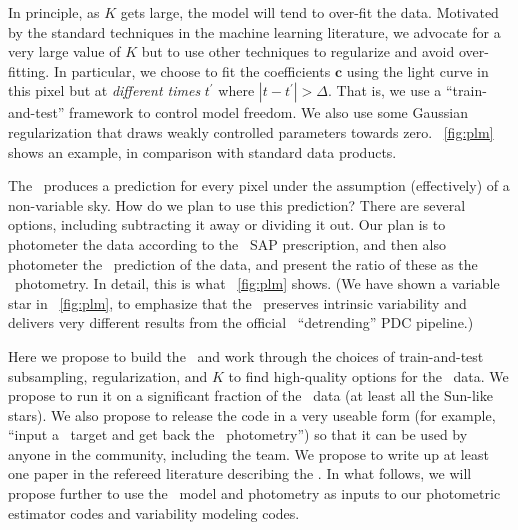 \documentclass[letterpaper,12pt,preprint]{hack_aastex}
\newcommand{\bvec}[1]{{\ensuremath{{\boldsymbol{#1}}}}}
\begin{document}
In principle, as $K$ gets large, the model will tend to over-fit the data.
Motivated by the standard techniques in the machine learning literature, we
advocate for a very large value of $K$ but to use other techniques to regularize
and avoid over-fitting.
In particular, we choose to fit the coefficients $\bvec{c}$ using the light
curve in this pixel but at \emph{different times} $t^\prime$ where
$|t-t^\prime| > \Delta$.
That is, we use a ``train-and-test'' framework to control model freedom.
We also use some Gaussian regularization that draws weakly controlled parameters
towards zero.
\figurename~\ref{fig:plm} shows an example, in comparison with standard \Kepler
data products.


The \PLM\ produces a prediction for every pixel under the assumption
(effectively) of a non-variable sky.
How do we plan to use this prediction?
There are several options, including subtracting it away or dividing it out.
Our plan is to photometer the data according to the \Kepler\ SAP prescription,
and then also photometer the \PLM\ prediction of the data, and present the
ratio of these as the \PLM\ photometry.
In detail, this is what \figurename~\ref{fig:plm} shows.
(We have shown a variable star in \figurename~\ref{fig:plm}, to emphasize that
the \PLM\ preserves intrinsic variability and delivers very different results
from the official \Kepler\ ``detrending'' PDC pipeline.)

Here we propose to build the \PLM\ and work through the choices of
train-and-test subsampling, regularization, and $K$ to find high-quality
options for the \Kepler\ data.
We propose to run it on a significant fraction of the
\Kepler\ data (at least all the Sun-like stars).
We also propose to release the code in a very useable form (for example, ``input
a \Kepler\ target and get back the \PLM\ photometry'') so that it can be used
by anyone in the community, including the  team.
We propose to write up at least one paper in the refereed literature describing
the \PLM.
In what follows, we will propose further to use the \PLM\ model and photometry
as inputs to our photometric estimator codes and variability modeling codes.
\end{document}
